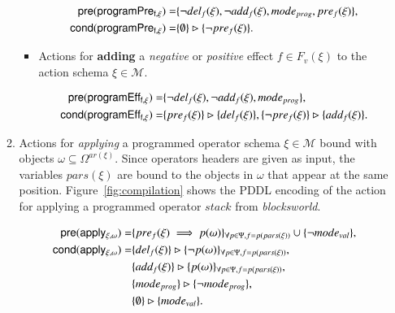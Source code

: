 \documentclass[3p,times]{elsarticle}
\newcommand{\pre}{\mathsf{pre}}  %
\newcommand{\cond}{\mathsf{cond}}   %
\begin{document}
\begin{itemize}
\begin{enumerate}
\begin{itemize}
\begin{small}
\begin{align*}
\hspace*{7pt}\pre(\mathsf{programPre_{f,\xi}})=&\{\neg del_{f}(\xi),\neg add_{f}(\xi), mode_{prog}, pre_{f}(\xi)\},\\
\cond(\mathsf{programPre_{f,\xi}})=&\{\emptyset\}\rhd\{\neg pre_{f}(\xi)\}.
\end{align*}
\end{small}

\item Actions for {\bf adding} a {\em negative} or {\em positive} effect $f\in F_v(\xi)$ to the action schema $\xi\in\mathcal{M}$.

\begin{small}
\begin{align*}
\hspace*{7pt}\pre(\mathsf{programEff_{f,\xi}})=&\{\neg del_{f}(\xi),\neg add_{f}(\xi), mode_{prog}\},\\
\cond(\mathsf{programEff_{f,\xi}})=&\{pre_{f}(\xi)\}\rhd\{del_{f}(\xi)\},\{\neg pre_{f}(\xi)\}\rhd\{add_{f}(\xi)\}.
\end{align*}
\end{small}
\end{itemize}

\item Actions for {\em applying} a programmed operator schema $\xi\in\mathcal{M}$ bound with objects $\omega\subseteq\Omega^{ar(\xi)}$. Since operators headers are given as input, the variables $pars(\xi)$ are bound to the objects in $\omega$ that appear at the same position. Figure~\ref{fig:compilation} shows the PDDL encoding of the action for applying a programmed operator $stack$ from {\em blocksworld}.
\begin{small}
\begin{align*}
\hspace*{7pt}\pre(\mathsf{apply_{\xi,\omega}})=&\{pre_{f}(\xi)\implies p(\omega)\}_{\forall p\in\Psi,f=p(pars(\xi))}\cup \{\neg mode_{val}\},\\
\cond(\mathsf{apply_{\xi,\omega}})=&\{del_{f}(\xi)\}\rhd\{\neg p(\omega)\}_{\forall p\in\Psi,f=p(pars(\xi))},\\
&\{add_{f}(\xi)\}\rhd\{p(\omega)\}_{\forall p\in\Psi,f=p(pars(\xi))},\\
&\{mode_{prog}\}\rhd\{\neg mode_{prog}\},\\
&\{\emptyset\}\rhd\{mode_{val}\}.
\end{align*}
\end{small}


\end{enumerate}
\end{itemize}
\end{document}
